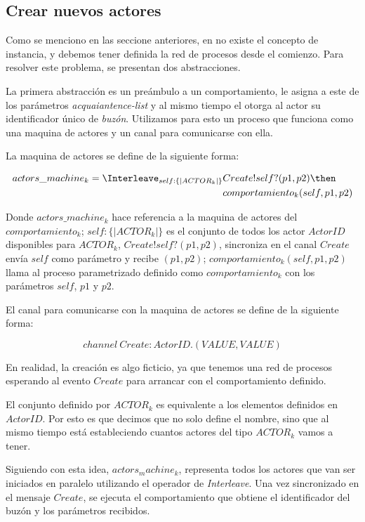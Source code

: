 \subsection{Crear nuevos actores}\label{modelo:crear}

Como se menciono en las seccione anteriores, en \CSP no existe el concepto de instancia, y debemos tener definida la red de procesos desde el comienzo. Para resolver este problema, se presentan dos abstracciones.

La primera abstracción es un preámbulo a un comportamiento, le asigna a este de los parámetros \textit{acquaiantence-list} y al mismo tiempo el otorga al actor su identificador único de \textit{buzón}. Utilizamos para esto un proceso que funciona como una maquina de actores y un canal para comunicarse con ella.

La maquina de actores se define de la siguiente forma:

\begin{align*}
actors\_machine_k = \Interleave_{ self : \{| ACTOR_k |\} } & Create!self?(p1, p2) \then \\
& comportamiento_k(self, p1, p2) 
\end{align*}

Donde $actors\_machine_k$ hace referencia a la maquina de actores del $comportamiento_k$; $self : \{| ACTOR_k |\}$ es el conjunto de todos los actor $ActorID$ disponibles para $ACTOR_k$, $Create!self?(p1, p2)$, sincroniza en el canal $Create$ envía $self$ como parámetro y recibe $(p1, p2)$; $comportamiento_k(self, p1, p2)$ llama al proceso parametrizado definido como $comportamiento_k$ con los parámetros $self$, $p1$ y $p2$.

El canal para comunicarse con la maquina de actores se define de la siguiente forma:

\[
channel\ Create:ActorID.(VALUE, VALUE)
\]

En realidad, la creación es algo ficticio, ya que tenemos una red de procesos \CSP esperando al evento $Create$ para arrancar con el comportamiento definido. 

El conjunto definido por $ACTOR_k$ es equivalente a los elementos definidos en $ActorID$. Por esto es que decimos que no solo define el nombre, sino que al mismo tiempo está estableciendo cuantos actores del tipo $ACTOR_k$ vamos a tener.

Siguiendo con esta idea, $actors_machine_k$, representa todos los actores que van ser iniciados en paralelo utilizando el operador de \textit{Interleave}. Una vez sincronizado en el mensaje $Create$, se ejecuta el comportamiento que obtiene el identificador del buzón y los parámetros recibidos.

